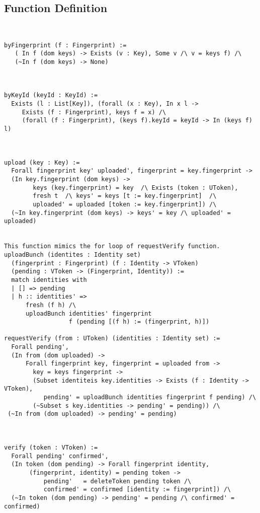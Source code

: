 \documentclass{article}
\begin{document}
\subsection{Function Definition}
\begin{verbatim}


byFingerprint (f : Fingerprint) := 
   ( In f (dom keys) -> Exists (v : Key), Some v /\ v = keys f) /\ 
   (~In f (dom keys) -> None) 
 


byKeyId (keyId : KeyId) :=
  Exists (l : List[Key]), (forall (x : Key), In x l -> 
     Exists (f : Fingerprint), keys f = x) /\
     (forall (f : Fingerprint), (keys f).keyId = keyId -> In (keys f) l)
      


upload (key : Key) := 
  Forall fingerprint key' uploaded', fingerprint = key.fingerprint -> 
  (In key.fingerprint (dom keys) -> 
        keys (key.fingerprint) = key  /\ Exists (token : UToken), 
        fresh t  /\ keys' = keys [t := key.fingerprint]  /\
        uploaded' = uploaded [token := key.fingerprint]) /\
  (~In key.fingerprint (dom keys) -> keys' = key /\ uploaded' = uploaded)  
         
              
This function mimics the for loop of requestVerify function.
uploadBunch (identites : Identity set) 
  (fingerprint : Fingerprint) (f : Identity -> VToken)  
  (pending : VToken -> (Fingerprint, Identity)) := 
  match identities with
  | [] => pending
  | h :: identities' => 
      fresh (f h) /\ 
      uploadBunch identities' fingerprint 
                  f (pending [(f h) := (fingerprint, h)])

requestVerify (from : UToken) (identities : Identity set) := 
  Forall pending',
  (In from (dom uploaded) -> 
      Forall fingerprint key, fingerprint = uploaded from -> 
        key = keys fingerprint -> 
        (Subset identiteis key.identities -> Exists (f : Identity -> VToken), 
           pending' = uploadBunch identities fingerprint f pending) /\
        (~Subset s key.identities -> pending' = pending)) /\
 (~In from (dom uploaded) -> pending' = pending)



verify (token : VToken) := 
  Forall pending' confirmed', 
  (In token (dom pending) -> Forall fingerprint identity,
       (fingerprint, identity) = pending token -> 
           pending'   = deleteToken pending token /\        
           confirmed' = confirmed [identity := fingerprint]) /\
  (~In token (dom pending) -> pending' = pending /\ confirmed' = confirmed)



\end{verbatim}
\end{document}
